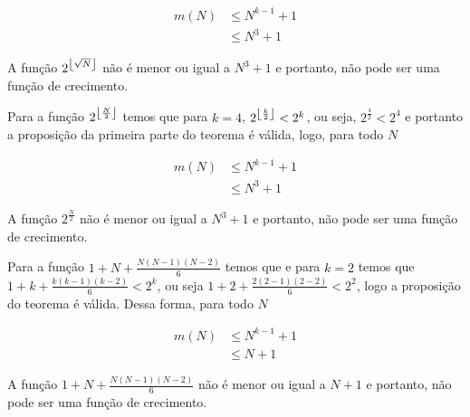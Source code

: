 \begin{align*}
    m(N) &\leq N^{k-1}+1 \\
    & \leq N^3 + 1
\end{align*}

A função $2^{\left\lfloor \sqrt{N} \right\rfloor}$ não é menor ou igual a $N^3 + 1$ e portanto, não pode ser uma função de crecimento.

Para a função $2^{\left\lfloor \frac{N}{2} \right\rfloor}$ temos que para $k = 4$, $2^{\left\lfloor \frac{k}{2} \right\rfloor} < 2^k$, ou seja, $2^{\frac{4}{2}} < 2^4$ e portanto a proposição da primeira parte do teorema é válida, logo, para todo $N$

\begin{align*}
    m(N) &\leq N^{k-1}+1 \\
    & \leq N^3 + 1
\end{align*}

A função $2^{\frac{N}{2}}$ não é menor ou igual a $N^3 + 1$ e portanto, não pode ser uma função de crecimento.

Para a função $1+N+\frac{N(N-1)(N-2)}{6}$ temos que e para $k = 2$ temos que $1+k+\frac{k(k-1)(k-2)}{6} < 2^k$, ou seja $1+2+\frac{2(2-1)(2-2)}{6} < 2^2$,  logo a proposição do teorema é válida. Dessa forma, para todo $N$ 

\begin{align*}
    m(N) &\leq N^{k-1}+1 \\
    & \leq N + 1
\end{align*}

A função $1+N+\frac{N(N-1)(N-2)}{6}$ não é menor ou igual a $N + 1$ e portanto, não pode ser uma função de crecimento.
